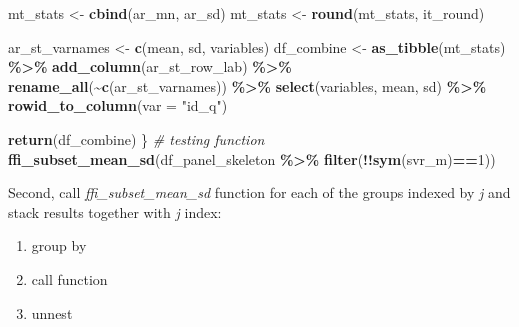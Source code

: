 \documentclass[
]{book}
\newenvironment{Shaded}{\begin{snugshade}}{\end{snugshade}}
\newcommand{\CommentTok}[1]{\textcolor[rgb]{0.56,0.35,0.01}{\textit{#1}}}
\newcommand{\DataTypeTok}[1]{\textcolor[rgb]{0.13,0.29,0.53}{#1}}
\newcommand{\DecValTok}[1]{\textcolor[rgb]{0.00,0.00,0.81}{#1}}
\newcommand{\KeywordTok}[1]{\textcolor[rgb]{0.13,0.29,0.53}{\textbf{#1}}}
\newcommand{\NormalTok}[1]{#1}
\newcommand{\OperatorTok}[1]{\textcolor[rgb]{0.81,0.36,0.00}{\textbf{#1}}}
\newcommand{\StringTok}[1]{\textcolor[rgb]{0.31,0.60,0.02}{#1}}
\providecommand{\tightlist}{%
  \setlength{\itemsep}{0pt}\setlength{\parskip}{0pt}}
\begin{document}
\begin{Shaded}
\begin{Highlighting}[]
\NormalTok{  mt\_stats \textless{}{-}}\StringTok{ }\KeywordTok{cbind}\NormalTok{(ar\_mn, ar\_sd)}
\NormalTok{  mt\_stats \textless{}{-}}\StringTok{ }\KeywordTok{round}\NormalTok{(mt\_stats, it\_round)}
  
\NormalTok{  ar\_st\_varnames \textless{}{-}}\StringTok{ }\KeywordTok{c}\NormalTok{(}\StringTok{\textquotesingle{}mean\textquotesingle{}}\NormalTok{, }\StringTok{\textquotesingle{}sd\textquotesingle{}}\NormalTok{, }\StringTok{\textquotesingle{}variables\textquotesingle{}}\NormalTok{)}
\NormalTok{  df\_combine \textless{}{-}}\StringTok{ }\KeywordTok{as\_tibble}\NormalTok{(mt\_stats) }\OperatorTok{\%\textgreater{}\%}\StringTok{ }
\StringTok{    }\KeywordTok{add\_column}\NormalTok{(ar\_st\_row\_lab) }\OperatorTok{\%\textgreater{}\%}
\StringTok{    }\KeywordTok{rename\_all}\NormalTok{(}\OperatorTok{\textasciitilde{}}\KeywordTok{c}\NormalTok{(ar\_st\_varnames)) }\OperatorTok{\%\textgreater{}\%}
\StringTok{    }\KeywordTok{select}\NormalTok{(variables, }\StringTok{\textquotesingle{}mean\textquotesingle{}}\NormalTok{, }\StringTok{\textquotesingle{}sd\textquotesingle{}}\NormalTok{) }\OperatorTok{\%\textgreater{}\%}
\StringTok{    }\KeywordTok{rowid\_to\_column}\NormalTok{(}\DataTypeTok{var =} \StringTok{"id\_q"}\NormalTok{)}
    
  \KeywordTok{return}\NormalTok{(df\_combine)}
\NormalTok{\}}
\CommentTok{\# testing function}
\KeywordTok{ffi\_subset\_mean\_sd}\NormalTok{(df\_panel\_skeleton }\OperatorTok{\%\textgreater{}\%}\StringTok{ }\KeywordTok{filter}\NormalTok{(}\OperatorTok{!!}\KeywordTok{sym}\NormalTok{(svr\_m)}\OperatorTok{==}\DecValTok{1}\NormalTok{))}
\end{Highlighting}
\end{Shaded}

Second, call \emph{ffi\_subset\_mean\_sd} function for each of the groups indexed by \emph{j} and stack results together with \emph{j} index:

\begin{enumerate}
\def\labelenumi{\arabic{enumi}.}
\tightlist
\item
  group by
\item
  call function
\item
  unnest
\end{enumerate}
\end{document}
